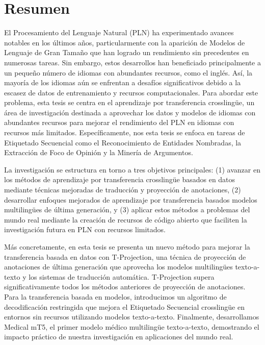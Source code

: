 
\chapter*{Resumen}

El Procesamiento del Lenguaje Natural (PLN) ha experimentado avances notables en los últimos años, particularmente con la aparición de Modelos de Lenguaje de Gran Tamaño que han logrado un rendimiento sin precedentes en numerosas tareas. Sin embargo, estos desarrollos han beneficiado principalmente a un pequeño número de idiomas con abundantes recursos, como el inglés. Así, la mayoría de los idiomas aún se enfrentan a desafíos significativos debido a la escasez de datos de entrenamiento y recursos computacionales. Para abordar este problema, esta tesis se centra en el aprendizaje por transferencia crosslingüe, un área de investigación destinada a aprovechar los datos y modelos de idiomas con abundantes recursos para mejorar el rendimiento del PLN en idiomas con recursos más limitados. Específicamente, nos esta tesis se enfoca en tareas de Etiquetado Secuencial como el Reconocimiento de Entidades Nombradas, la Extracción de Foco  de Opinión y la Minería de Argumentos.

La investigación se estructura en torno a tres objetivos principales: (1) avanzar en los métodos de aprendizaje por transferencia crosslingüe basados en datos mediante técnicas mejoradas de traducción y proyección de anotaciones, (2) desarrollar enfoques mejorados de aprendizaje por transferencia basados modelos multilingües de última generación, y (3) aplicar estos métodos a problemas del mundo real mediante la creación de recursos de código abierto que faciliten la investigación futura en PLN con recursos limitados.

Más concretamente, en esta tesis se presenta un nuevo método para mejorar la transferencia basada en datos con T-Projection, una técnica de proyección de anotaciones de última generación que aprovecha los modelos multilingües texto-a-texto y los sistemas de traducción automática. T-Projection supera significativamente todos los métodos anteriores de proyección de anotaciones. Para la transferencia basada en modelos, introducimos un algoritmo de decodificación restringida que mejora el Etiquetado Secuencial crosslingüe en entornos sin recursos utilizando modelos texto-a-texto. Finalmente, desarrollamos Medical mT5, el primer modelo médico multilingüe texto-a-texto, demostrando el impacto práctico de nuestra investigación en aplicaciones del mundo real.